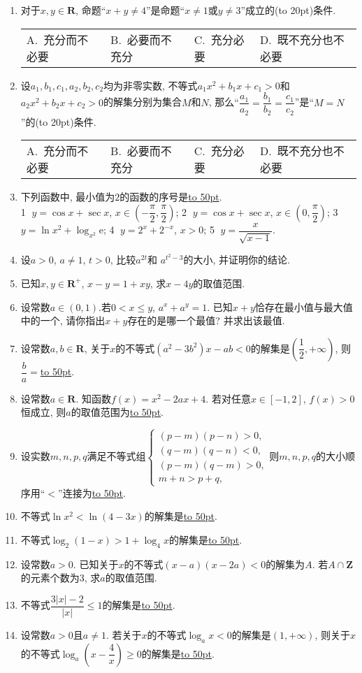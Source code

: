 \documentclass[10pt,a4paper]{article}
\newcommand{\blank}[1]{\underline{\hbox to #1pt{}}}
\newcommand{\bracket}[1]{(\hbox to #1pt{})}
\newcommand{\fourch}[4]{\par\begin{tabular}{p{.23\textwidth}p{.23\textwidth}p{.23\textwidth}p{.23\textwidth}}
A.~#1 &B.~#2& C.~#3& D.~#4
\end{tabular}}
\begin{document}
\begin{enumerate}[1.]
\fourch{充分而不必要}{必要而不充分}{充分必要}{既不充分也不必要}
\item 对于$x,y\in \mathbf{R}$, 命题``$x+y\ne 4$''是命题``$x\ne 1$或$y\ne 3$''成立的\bracket{20}条件.
\fourch{充分而不必要}{必要而不充分}{充分必要}{既不充分也不必要}
\item 设$a_1,b_1,c_1,a_2,b_2,c_2$均为非零实数, 不等式$a_1x^2+b_1x+c_1>0$和$a_2x^2+b_2x+c_2>0$的解集分别为集合$M$和$N$, 那么``$\dfrac{a_1}{a_2}=\dfrac{b_1}{b_2}=\dfrac{c_1}{c_2}$''是``$M=N$''的\bracket{20}条件.
\fourch{充分而不必要}{必要而不充分}{充分必要}{既不充分也不必要}
\item 下列函数中, 最小值为$2$的函数的序号是\blank{50}.\\
\textcircled{1} $y=\cos x+\sec x$, $x\in (-\dfrac{\pi}2, \dfrac{\pi}2)$; \textcircled{2} $y=\cos x+\sec x$, $x\in (0,\dfrac{\pi}{2})$; \textcircled{3} $y=\ln x^2+\log_{x^2}\mathrm{e}$; \textcircled{4} $y=2^x+2^{-x}$, $x>0$; \textcircled{5} $y=\dfrac x{\sqrt {x-1}}$.
\item 设$a>0$, $a\ne 1$, $t>0$, 比较$a^{2t}$和 $a^{t^2-3}$的大小, 并证明你的结论.
\item 已知$x,y\in \mathbf{R}^+$, $x-y=1+xy$, 求$x-4y$的取值范围.
\item 设常数$a\in (0, 1)$.若$0<x\le y$, $a^x+a^y=1$. 已知$x+y$恰存在最小值与最大值中的一个, 请你指出$x+y$存在的是哪一个最值? 并求出该最值.
\item 设常数$a, b\in \mathbf{R}$, 关于$x$的不等式$(a^2-3b^2)x-ab<0$的解集是$(\dfrac 12, +\infty)$, 则$\dfrac ba=$\blank{50}.
\item 设常数$a\in \mathbf{R}$. 知函数$f(x)=x^2-2ax+4$. 若对任意$x\in [-1, 2]$, $f(x)>0$恒成立, 则$a$的取值范围为\blank{50}.
\item 设实数$m, n, p, q$满足不等式组$\begin{cases} (p-m)(p-n)>0, \\  (q-m)(q-n)<0, \\ (p-m)(q-m)>0, \\  m+n>p+q, \end{cases}$则$m, n, p, q$的大小顺序用``$<$''连接为\blank{50}.
\item 不等式$\ln x^2<\ln (4-3x)$的解集是\blank{50}.
\item 不等式$\log_2(1-x)>1+\log_4x$的解集是\blank{50}.
\item 设常数$a>0$. 已知关于$x$的不等式$(x-a)(x-2a)<0$的解集为$A$. 若$A\cap \mathbf{Z}$的元素个数为$3$, 求$a$的取值范围.
\item 不等式$\dfrac{3|x|-2}{|x|}\le 1$的解集是\blank{50}.
\item 设常数$a>0$且$a\ne 1$. 若关于$x$的不等式$\log_ax<0$的解集是$(1,+\infty)$, 则关于$x$的不等式$\log_a(x-\dfrac 4x)\ge 0$的解集是\blank{50}.

\end{enumerate}
\end{document}
